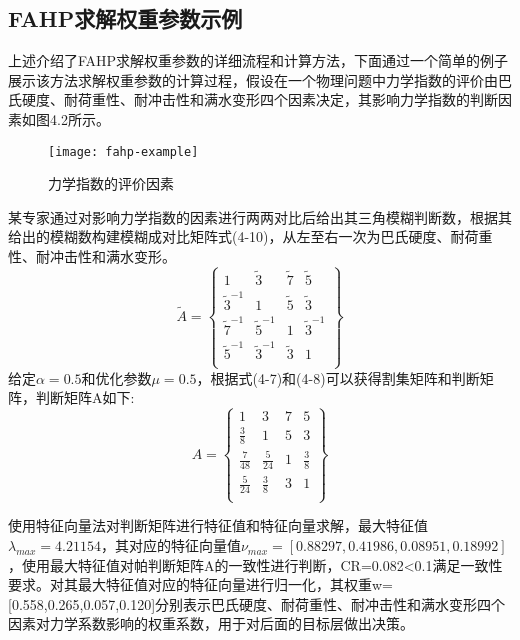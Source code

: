 \subsection{FAHP求解权重参数示例}
上述介绍了FAHP求解权重参数的详细流程和计算方法，下面通过一个简单的例子展示该方法求解权重参数的计算过程，假设在一个物理问题中力学指数的评价由巴氏硬度、耐荷重性、耐冲击性和满水变形四个因素决定，其影响力学指数的判断因素如图4.2所示。
\begin{figure}[H] %
	\centering
	\texttt{[image: fahp-example]}
	\caption{力学指数的评价因素}
	\label{fig:xfig1}
\end{figure}
某专家通过对影响力学指数的因素进行两两对比后给出其三角模糊判断数，根据其给出的模糊数构建模糊成对比矩阵式(4-10)，从左至右一次为巴氏硬度、耐荷重性、耐冲击性和满水变形。
\begin{equation}
\widetilde{A} = \left\{\begin{array}{cccc}
1 & \widetilde{3} & \widetilde{7} & \widetilde{5}  \\
\widetilde{3}^{-1} & 1 & \widetilde{5} & \widetilde{3} \\
\widetilde{7}^{-1} & \widetilde{5}^{-1} & 1 & \widetilde{3}^{-1} \\
\widetilde{5}^{-1} & \widetilde{3}^{-1} & \widetilde{3} & 1 \\
\end{array}\right\}
\end{equation}
给定$\alpha=0.5$和优化参数$\mu=0.5$，根据式(4-7)和(4-8)可以获得割集矩阵和判断矩阵，判断矩阵A如下:
\begin{equation}
A = \left\{\begin{array}{cccc}
1 & 3 & 7 & 5 \\
\frac{3}{8} & 1 & 5 & 3 \\
\frac{7}{48} & \frac{5}{24} & 1 & \frac{3}{8} \\
\frac{5}{24} & \frac{3}{8} & 3 & 1 \\
\end{array}\right\}
\end{equation}

使用特征向量法对判断矩阵进行特征值和特征向量求解，最大特征值$\lambda_{max}=4.21154$，其对应的特征向量值$\nu_{max}=[0.88297,0.41986,0.08951,0.18992]$，使用最大特征值对帕判断矩阵A的一致性进行判断，CR=0.082<0.1满足一致性要求。对其最大特征值对应的特征向量进行归一化，其权重w=[0.558,0.265,0.057,0.120]分别表示巴氏硬度、耐荷重性、耐冲击性和满水变形四个因素对力学系数影响的权重系数，用于对后面的目标层做出决策。

